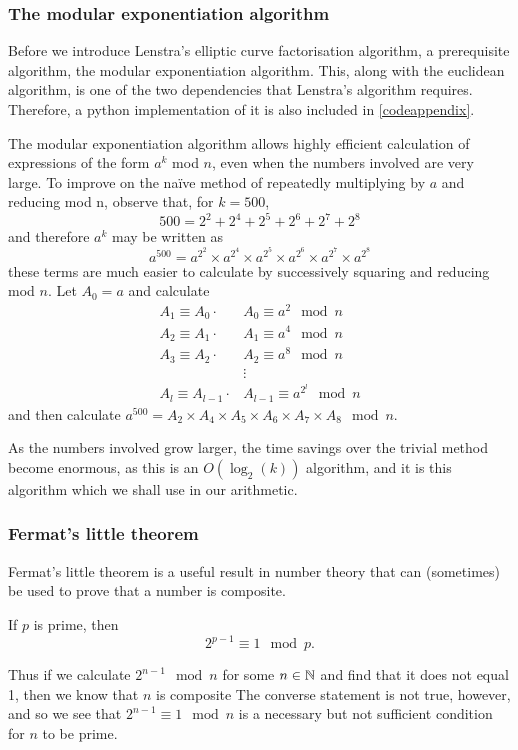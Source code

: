 \subsubsection{The modular exponentiation algorithm}
Before we introduce Lenstra's elliptic curve factorisation algorithm, a prerequisite algorithm, the modular exponentiation algorithm.
This, along with the euclidean algorithm, is one of the two dependencies that Lenstra's algorithm requires.
Therefore, a python implementation of it is also included in \cref{codeappendix}.
\begin{definition}
	The modular exponentiation algorithm allows highly efficient calculation of expressions of the form $a^k$ mod $n$, even when the numbers involved are very large.
	To improve on the naïve method of repeatedly multiplying by $a$ and reducing mod n, observe that, for $k=500$,
$$500=2^2+2^4+2^5+2^6+2^7+2^8$$
and therefore $a^k$ may be written as
$$a^{500} = a^{2^{2}} \times a^{2^{4}} \times a^{2^{5}} \times a^{2^{6}} \times a^{2^{7}} \times a^{2^{8}}$$
these terms are much easier to calculate by successively squaring and reducing mod $n$.
Let $A_0 = a$ and calculate
\begin{align*}
	A_1\equiv A_0\cdot &A_0 \equiv a^2 \mod n\\
	A_2\equiv A_1\cdot &A_1 \equiv a^4 \mod n\\
	A_3\equiv A_2\cdot &A_2 \equiv a^8 \mod n\\
	&\vdots\\
	A_l\equiv A_{l-1}\cdot &A_{l-1} \equiv a^{2^{l}} \mod n
\end{align*}
and then calculate $a^{500} = A_2 \times A_4 \times A_5 \times A_6 \times A_7 \times A_8 \mod n$.
\end{definition}
As the numbers involved grow larger, the time savings over the trivial method become enormous, as this is an $O(\log_2(k))$ algorithm, and it is this algorithm which we shall use in our arithmetic.

\subsubsection{Fermat's little theorem}
Fermat's little theorem is a useful result in number theory that can (sometimes) be used to prove that a number is composite.
\begin{theorem}
	If $p$ is prime, then
	$$2^{p-1} \equiv 1 \mod p.$$
\end{theorem}
Thus if we calculate $2^{n-1} \mod n$ for some $n\in\mathbb{N}$ and find that it does not equal 1, then we know that $n$ is composite
The converse statement is not true, however, and so we see that $2^{n-1} \equiv 1 \mod n$ is a necessary but not sufficient condition for $n$ to be prime.

